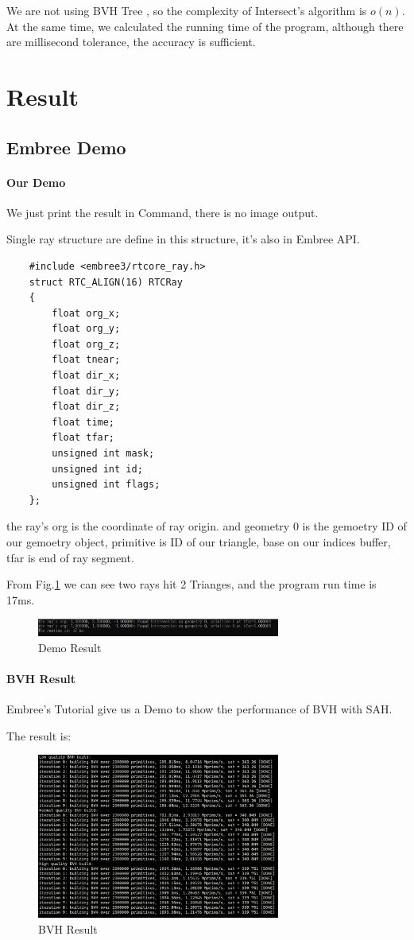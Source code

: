 \documentclass[conference]{IEEEtran}
\begin{document}
We are not using BVH Tree , so the complexity of Intersect's algorithm is $o(n)$. At the same time, we calculated the running time of the program, although there are millisecond tolerance, the accuracy is sufficient.

\section{Result}
\subsection{Embree Demo}
\paragraph{Our Demo}
We just print the result in Command, there is no image output.

Single ray structure are define in this structure, it's also in Embree API.
\lstset{language=C++}
\begin{lstlisting}
    #include <embree3/rtcore_ray.h>
    struct RTC_ALIGN(16) RTCRay
    { 
        float org_x; 
        float org_y; 
        float org_z; 
        float tnear; 
        float dir_x; 
        float dir_y; 
        float dir_z; 
        float time; 
        float tfar;  
        unsigned int mask; 
        unsigned int id;  
        unsigned int flags; 
    };
\end{lstlisting}
the ray's org is the coordinate of ray origin. and geometry 0 is the gemoetry ID of our gemoetry object, primitive is ID of our triangle, base on our indices buffer, tfar is end of ray segment. 

From Fig.\ref{Demo_Result} we can see two rays hit 2 Trianges, and the program run time is 17ms.
\begin{figure}[ht]
    \caption{Demo Result}
    \label{Demo_Result}
    \centering 
    \includegraphics[width=8cm]{Demo_Result.jpg}
\end{figure}
\paragraph{BVH Result}
Embree's Tutorial give us a Demo to show the performance of BVH with SAH.

The result is:
\begin{figure}[ht]
    \caption{BVH Result}
    \label{BVH_Result}
    \centering 
    \includegraphics[width=8cm]{BVH_Result.jpg}
\end{figure}
\end{document}
